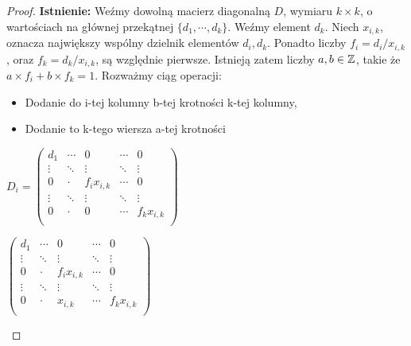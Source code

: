 \begin{proof}
\textbf{Istnienie:} Weźmy dowolną macierz diagonalną $D$, wymiaru $k \times k$, o wartościach na głównej przekątnej $\lbrace d_{1}, \cdots, d_{k} \rbrace$. Weźmy element $d_{k}$. Niech $x_{i,k}$, oznacza największy wspólny dzielnik elementów $d_{i}, d_{k}$. Ponadto liczby $f_{i}=d_{i}/x_{i,k}$, oraz $f_{k}=d_{k}/x_{i,k}$, są względnie pierwsze. Istnieją zatem liczby $a, b \in \mathbb Z$, takie że $a \times f_{i} + b \times f_{k} = 1$. Rozważmy ciąg operacji:
\begin{itemize}
\item Dodanie do i-tej kolumny b-tej krotności k-tej kolumny,
\item Dodanie to k-tego wiersza a-tej krotności
\end{itemize}

\begin{minipage}{0.5\textwidth}
\begin{center}

			$D_{i}= \begin{pmatrix}
			d_{1} & \cdots & 0 & \cdots &0 \\
			\vdots & \ddots& \vdots & \ddots &\vdots\\
			0 & \cdot & f_{i}x_{i,k} & \cdots & 0\\
			\vdots & \ddots& \vdots & \ddots &\vdots\\ 
			0 & \cdot & 0 & \cdots & f_{k}x_{i,k}\\			
			\end{pmatrix}$
			

\end{center}
\end{minipage}
\begin{minipage}{0.5\textwidth}
\begin{center}

			$\begin{pmatrix}
			d_{1} & \cdots & 0 & \cdots &0 \\
			\vdots & \ddots& \vdots & \ddots &\vdots\\
			0 & \cdot & f_{i}x_{i,k} & \cdots & 0\\
			\vdots & \ddots& \vdots & \ddots &\vdots\\ 
			0 & \cdot & x_{i,k} & \cdots & f_{k}x_{i,k}\\			
			\end{pmatrix}$

			
\end{center}
\end{minipage}


\end{proof}
